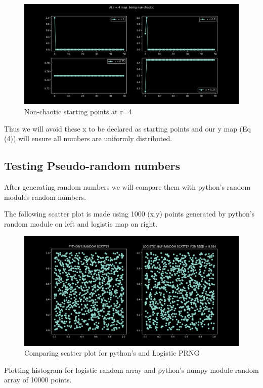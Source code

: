 \documentclass{report}
\begin{document}
\begin{figure}[!h]
    \centering
    \includegraphics[scale=.45]{images/bummer.png}
    \caption{Non-chaotic starting points at r=4}
    \label{fig:my_label8}
\end{figure}

Thus we will avoid these x to be declared as starting points and our y map (Eq (4)) will ensure all numbers are uniformly distributed.
\newpage
\subsection{Testing Pseudo-random numbers}
After generating random numbers we will compare them with python's random modules random numbers.

The following scatter plot is made using 1000 (x,y) points generated by python's random module on left and logistic map on right.

\begin{figure}[!h]
    \centering
    \includegraphics[scale=.45]{images/prngscat.png}
    \caption{Comparing scatter plot for python's and Logistic PRNG}
    \label{fig:my_label9}
\end{figure}

Plotting histogram for logistic random array and python's numpy module random array of 10000 points.
\end{document}
